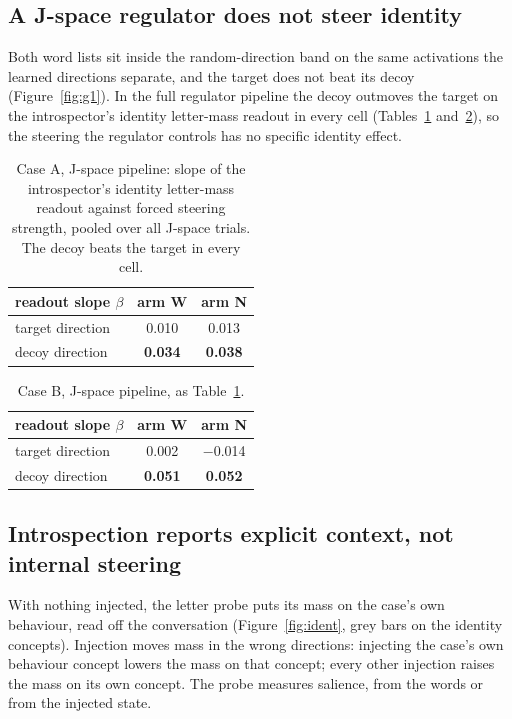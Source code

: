 \subsection{A J-space regulator does not steer identity}

Both word lists sit inside the random-direction band on the same
activations the learned directions separate, and the target does not beat
its decoy (Figure~\ref{fig:g1}). In the full regulator pipeline the decoy outmoves the target on the introspector's identity letter-mass readout in every cell (Tables~\ref{tab:jspaceA} and~\ref{tab:jspaceB}), so the steering the regulator
controls has no specific identity effect.

\begin{table}[!htbp]
  \centering\small
  \begin{tabular}{lcc}
    \toprule
    readout slope $\beta$ & arm W & arm N \\
    \midrule
    target direction & 0.010 & 0.013 \\
    decoy direction  & \textbf{0.034} & \textbf{0.038} \\
    \bottomrule
  \end{tabular}
  \caption{Case A, J-space pipeline: slope of the introspector's identity letter-mass readout against forced steering strength, pooled over all J-space trials. The decoy beats the target in every cell.}
  \label{tab:jspaceA}
\end{table}

\begin{table}[!htbp]
  \centering\small
  \begin{tabular}{lcc}
    \toprule
    readout slope $\beta$ & arm W & arm N \\
    \midrule
    target direction & 0.002 & $-$0.014 \\
    decoy direction  & \textbf{0.051} & \textbf{0.052} \\
    \bottomrule
  \end{tabular}
  \caption{Case B, J-space pipeline, as Table~\ref{tab:jspaceA}.}
  \label{tab:jspaceB}
\end{table}

\subsection{Introspection reports explicit context, not internal steering}

With nothing injected, the letter probe puts its mass on the case's own
behaviour, read off the conversation (Figure~\ref{fig:ident}, grey bars
on the identity concepts). Injection moves mass in the wrong directions: injecting the case's own behaviour concept lowers the mass on that concept; every other injection raises the mass on its own concept. The probe measures salience, from the words or from the
injected state.

